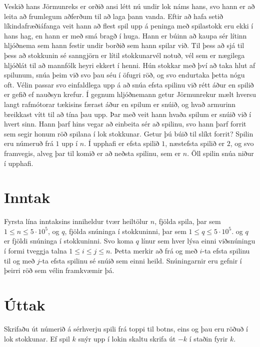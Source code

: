 
Veskið hans Jörmunreks er orðið ansi létt nú undir lok náms hans, svo hann er að leita að frumlegum aðferðum til
að laga þann vanda. Eftir að hafa setið líkindafræðiáfanga veit hann að flest spil upp á peninga með spilastokk eru ekki í hans hag, en hann
er með smá bragð í huga. Hann er búinn að kaupa sér lítinn hljóðnema sem hann festir undir borðið sem hann spilar við.
Til þess að sjá til þess að stokkunin sé sanngjörn er lítil stokkunarvél notuð, vél sem er nægilega hljóðlát til að
mannfólk heyri ekkert í henni. Hún stokkar með því að taka hlut af spilunum, snúa þeim við svo þau séu í öfugri röð, og
svo endurtaka þetta nógu oft. Vélin passar svo einfaldlega upp á að snúa efsta spilinu við rétt áður en spilið er gefið ef 
nauðsyn krefur. Í gegnum hljóðnemann getur Jörmunrekur mælt hversu langt rafmótorar tækisins færast áður en spilum er snúið,
og hvað armurinn breikkast vítt til að tína þau upp. Þar með veit hann hvaða spilum er snúið við í hvert sinn. Hann þarf
hins vegar að einbeita sér að spilinu, svo hann þarf forrit sem segir honum röð spilana í lok stokkunar.
Getur þú búið til slíkt forrit?
Spilin eru númeruð frá $1$ upp í $n$.
Í upphafi er efsta spilið $1$, næstefsta spilið er $2$, og svo framvegis, alveg þar til komið er að neðsta spilinu, sem er $n$.
Öll spilin snúa niður í upphafi.

\section*{Inntak}
Fyrsta lína inntaksins inniheldur tvær heiltölur $n$, fjölda spila, þar sem $1 \leq n \leq 5 \cdot 10^5$, og $q$, fjölda snúninga í stokkuninni, þar sem $1 \leq q \leq 5 \cdot 10^5$.
og $q$ er fjöldi snúninga í stokkuninni. Svo koma $q$ línur sem hver lýsa einni viðsnúningu í formi tveggja talna $1 \leq 
i \leq j \leq n$. Þetta merkir að frá og með $i$-ta efsta spilinu til og með $j$-ta efsta spilinu sé snúið sem einni heild. Snúningarnir
eru gefnir í þeirri röð sem vélin framkvæmir þá.

\section*{Úttak}
Skrifaðu út númerið á sérhverju spili frá toppi til botns, eins og þau eru röðuð í lok stokkunar.
Ef spil $k$ snýr upp í lokin skaltu skrifa út $-k$ í staðin fyrir $k$.

